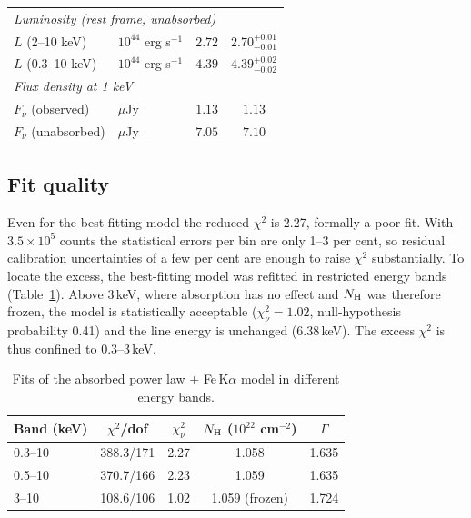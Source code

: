 \documentclass[11pt,a4paper]{article}
\newcommand{\nh}{N_{\rm H}}
\begin{document}
\begin{table}[H]
\begin{tabular}{llcc}
\multicolumn{4}{l}{\textit{Luminosity (rest frame, unabsorbed)}}\\
$L$ (2--10 keV) & $10^{44}$ erg s$^{-1}$ & $2.72$ & $2.70^{+0.01}_{-0.01}$ \\
$L$ (0.3--10 keV) & $10^{44}$ erg s$^{-1}$ & $4.39$ & $4.39^{+0.02}_{-0.02}$ \\[3pt]
\multicolumn{4}{l}{\textit{Flux density at 1 keV}}\\
$F_\nu$ (observed) & $\mu$Jy & $1.13$ & $1.13$ \\
$F_\nu$ (unabsorbed) & $\mu$Jy & $7.05$ & $7.10$ \\
\bottomrule
\end{tabular}
\end{table}

\subsection{Fit quality}
\label{sec:quality}

Even for the best-fitting model the reduced $\chi^2$ is 2.27, formally a poor fit. With $3.5\times10^5$ counts the statistical errors per bin are only 1--3 per cent, so residual calibration uncertainties of a few per cent are enough to raise $\chi^2$ substantially. To locate the excess, the best-fitting model was refitted in restricted energy bands (Table~\ref{tab:diag}). Above 3\,keV, where absorption has no effect and $\nh$ was therefore frozen, the model is statistically acceptable ($\chi^2_\nu=1.02$, null-hypothesis probability 0.41) and the line energy is unchanged (6.38\,keV). The excess $\chi^2$ is thus confined to 0.3--3\,keV.

\begin{table}[H]
\centering
\caption{Fits of the absorbed power law + Fe\,K$\alpha$ model in different energy bands.}
\label{tab:diag}
\begin{tabular}{lcccc}
\toprule
Band (keV) & $\chi^2$/dof & $\chi^2_\nu$ & $\nh$ ($10^{22}$ cm$^{-2}$) & $\Gamma$ \\
\midrule
0.3--10 & 388.3/171 & 2.27 & 1.058 & 1.635 \\
0.5--10 & 370.7/166 & 2.23 & 1.059 & 1.635 \\
3--10 & 108.6/106 & 1.02 & 1.059 (frozen) & 1.724 \\
\bottomrule
\end{tabular}
\end{table}
\end{document}
